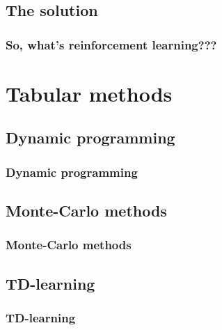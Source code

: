 \documentclass{beamer}
\begin{document}
\subsection{The solution}
\begin{frame}
    \frametitle{So, what's reinforcement learning???}
\end{frame}

\section{Tabular methods}
\subsection{Dynamic programming}
\begin{frame}
    \frametitle{Dynamic programming}
\end{frame}

\subsection{Monte-Carlo methods}
\begin{frame}
    \frametitle{Monte-Carlo methods}
\end{frame}

\subsection{TD-learning}
\begin{frame}
    \frametitle{TD-learning}
\end{frame}
\end{document}
